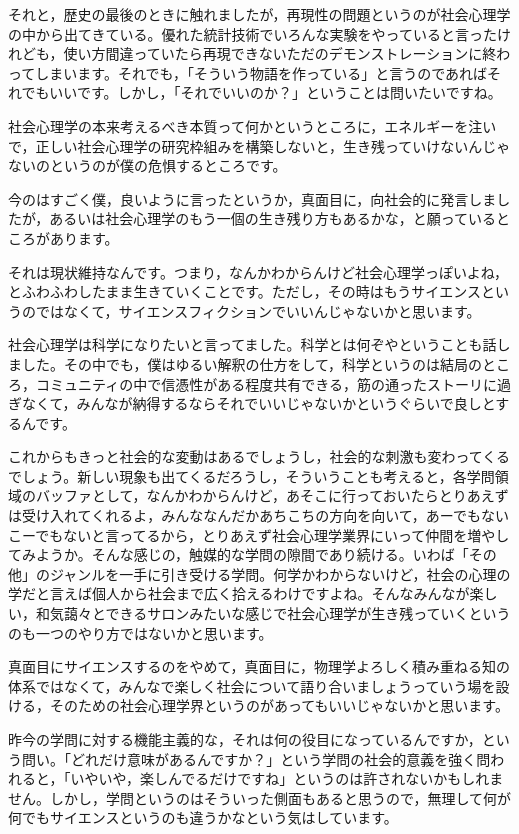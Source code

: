 \documentclass{ltjsbook}
\begin{document}
それと，歴史の最後のときに触れましたが，再現性の問題というのが社会心理学の中から出てきている。優れた統計技術でいろんな実験をやっていると言ったけれども，使い方間違っていたら再現できないただのデモンストレーションに終わってしまいます。それでも，「そういう物語を作っている」と言うのであればそれでもいいです。しかし，「それでいいのか？」ということは問いたいですね。

社会心理学の本来考えるべき本質って何かというところに，エネルギーを注いで，正しい社会心理学の研究枠組みを構築しないと，生き残っていけないんじゃないのというのが僕の危惧するところです。


今のはすごく僕，良いように言ったというか，真面目に，向社会的に発言しましたが，あるいは社会心理学のもう一個の生き残り方もあるかな，と願っているところがあります。

それは現状維持なんです。つまり，なんかわからんけど社会心理学っぽいよね，とふわふわしたまま生きていくことです。ただし，その時はもうサイエンスというのではなくて，サイエンスフィクションでいいんじゃないかと思います。

社会心理学は科学になりたいと言ってました。科学とは何ぞやということも話しました。その中でも，僕はゆるい解釈の仕方をして，科学というのは結局のところ，コミュニティの中で信憑性がある程度共有できる，筋の通ったストーリに過ぎなくて，みんなが納得するならそれでいいじゃないかというぐらいで良しとするんです。

これからもきっと社会的な変動はあるでしょうし，社会的な刺激も変わってくるでしょう。新しい現象も出てくるだろうし，そういうことも考えると，各学問領域のバッファとして，なんかわからんけど，あそこに行っておいたらとりあえずは受け入れてくれるよ，みんななんだかあちこちの方向を向いて，あーでもないこーでもないと言ってるから，とりあえず社会心理学業界にいって仲間を増やしてみようか。そんな感じの，触媒的な学問の隙間であり続ける。いわば「その他」のジャンルを一手に引き受ける学問。何学かわからないけど，社会の心理の学だと言えば個人から社会まで広く拾えるわけですよね。そんなみんなが楽しい，和気藹々とできるサロンみたいな感じで社会心理学が生き残っていくというのも一つのやり方ではないかと思います。

真面目にサイエンスするのをやめて，真面目に，物理学よろしく積み重ねる知の体系ではなくて，みんなで楽しく社会について語り合いましょうっていう場を設ける，そのための社会心理学界というのがあってもいいじゃないかと思います。

昨今の学問に対する機能主義的な，それは何の役目になっているんですか，という問い。「どれだけ意味があるんですか？」という学問の社会的意義を強く問われると，「いやいや，楽しんでるだけですね」というのは許されないかもしれません。しかし，学問というのはそういった側面もあると思うので，無理して何が何でもサイエンスというのも違うかなという気はしています。
\end{document}
